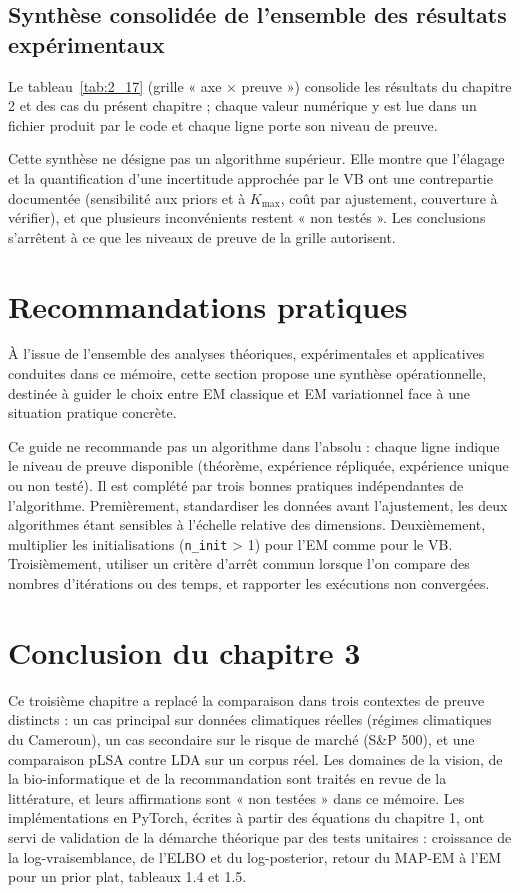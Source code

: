 \subsection{Synthèse consolidée de l'ensemble des résultats expérimentaux}
Le tableau~\ref{tab:2_17} (grille « axe $\times$ preuve ») consolide les résultats du chapitre 2 et des cas du présent chapitre ; chaque valeur numérique y est lue dans un fichier produit par le code et chaque ligne porte son niveau de preuve.

Cette synthèse ne désigne pas un algorithme supérieur. Elle montre que l'élagage et la quantification d'une incertitude approchée par le VB ont une contrepartie documentée (sensibilité aux priors et à $K_{\max}$, coût par ajustement, couverture à vérifier), et que plusieurs inconvénients restent « non testés ». Les conclusions s'arrêtent à ce que les niveaux de preuve de la grille autorisent.

\section{Recommandations pratiques}
À l'issue de l'ensemble des analyses théoriques, expérimentales et applicatives conduites dans ce mémoire, cette section propose une synthèse opérationnelle, destinée à guider le choix entre EM classique et EM variationnel face à une situation pratique concrète.

Ce guide ne recommande pas un algorithme dans l'absolu : chaque ligne indique le niveau de preuve disponible (théorème, expérience répliquée, expérience unique ou non testé). Il est complété par trois bonnes pratiques indépendantes de l'algorithme. Premièrement, standardiser les données avant l'ajustement, les deux algorithmes étant sensibles à l'échelle relative des dimensions. Deuxièmement, multiplier les initialisations (\texttt{n\_init} > 1) pour l'EM comme pour le VB. Troisièmement, utiliser un critère d'arrêt commun lorsque l'on compare des nombres d'itérations ou des temps, et rapporter les exécutions non convergées.

\section{Conclusion du chapitre 3}
Ce troisième chapitre a replacé la comparaison dans trois contextes de preuve distincts : un cas principal sur données climatiques réelles (régimes climatiques du Cameroun), un cas secondaire sur le risque de marché (S\&P 500), et une comparaison pLSA contre LDA sur un corpus réel. Les domaines de la vision, de la bio-informatique et de la recommandation sont traités en revue de la littérature, et leurs affirmations sont « non testées » dans ce mémoire. Les implémentations en PyTorch, écrites à partir des équations du chapitre 1, ont servi de validation de la démarche théorique par des tests unitaires : croissance de la log-vraisemblance, de l'ELBO et du log-posterior, retour du MAP-EM à l'EM pour un prior plat, tableaux 1.4 et 1.5.

